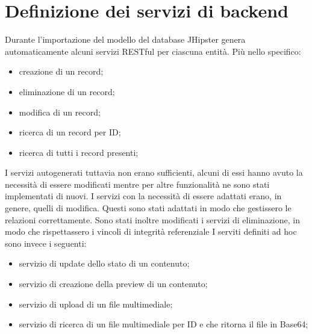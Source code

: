 \section{Definizione dei servizi di backend}
Durante l'importazione del modello del database JHipster genera automaticamente alcuni servizi RESTful per ciascuna entità. Più nello specifico:
\begin{itemize}
    \item creazione di un record;
    \item eliminazione di un record;
    \item modifica di un record;
    \item ricerca di un record per ID;
    \item ricerca di tutti i record presenti;
\end{itemize}
I servizi autogenerati tuttavia non erano sufficienti, alcuni di essi hanno avuto la necessità di essere modificati mentre per altre funzionalità ne sono stati implementati di nuovi. I servizi con la necessità di essere adattati erano, in genere, quelli di modifica. Questi sono stati adattati in modo che gestissero le relazioni correttamente. Sono stati inoltre modificati i servizi di eliminazione, in modo che rispettassero i vincoli di integrità referenziale
I serviti definiti ad hoc sono invece i seguenti:
\begin{itemize}
    \item servizio di update dello stato di un contenuto;
    \item servizio di creazione della preview di un contenuto;
    \item servizio di upload di un file multimediale;
    \item servizio di ricerca di un file multimediale per ID e che ritorna il file in Base64;
\end{itemize}
